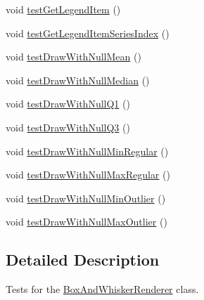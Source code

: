 \begin{DoxyCompactItemize}
\item 
void \mbox{\hyperlink{classorg_1_1jfree_1_1chart_1_1renderer_1_1category_1_1_box_and_whisker_renderer_test_afc41c9e1fb580f8d88d0dc4d55e3d8d6}{test\+Get\+Legend\+Item}} ()
\item 
void \mbox{\hyperlink{classorg_1_1jfree_1_1chart_1_1renderer_1_1category_1_1_box_and_whisker_renderer_test_abb58684c926f0909bea3137fe7d1fa5b}{test\+Get\+Legend\+Item\+Series\+Index}} ()
\item 
void \mbox{\hyperlink{classorg_1_1jfree_1_1chart_1_1renderer_1_1category_1_1_box_and_whisker_renderer_test_afd310ed08773de1125a9bb5cccc7d76e}{test\+Draw\+With\+Null\+Mean}} ()
\item 
void \mbox{\hyperlink{classorg_1_1jfree_1_1chart_1_1renderer_1_1category_1_1_box_and_whisker_renderer_test_a0e1ec38f0f1bec11572fc6311cfcfa0a}{test\+Draw\+With\+Null\+Median}} ()
\item 
void \mbox{\hyperlink{classorg_1_1jfree_1_1chart_1_1renderer_1_1category_1_1_box_and_whisker_renderer_test_a73f9159c849fbd54b7421ed5a1f9985d}{test\+Draw\+With\+Null\+Q1}} ()
\item 
void \mbox{\hyperlink{classorg_1_1jfree_1_1chart_1_1renderer_1_1category_1_1_box_and_whisker_renderer_test_a096520be2c66dad38d5140f5bc9df709}{test\+Draw\+With\+Null\+Q3}} ()
\item 
void \mbox{\hyperlink{classorg_1_1jfree_1_1chart_1_1renderer_1_1category_1_1_box_and_whisker_renderer_test_a0a5ced35511f005e6428a51ef565dcfc}{test\+Draw\+With\+Null\+Min\+Regular}} ()
\item 
void \mbox{\hyperlink{classorg_1_1jfree_1_1chart_1_1renderer_1_1category_1_1_box_and_whisker_renderer_test_a142219f083a423063d924ac8cf5f999a}{test\+Draw\+With\+Null\+Max\+Regular}} ()
\item 
void \mbox{\hyperlink{classorg_1_1jfree_1_1chart_1_1renderer_1_1category_1_1_box_and_whisker_renderer_test_a55d15a00e7c09182c77cdd1787661455}{test\+Draw\+With\+Null\+Min\+Outlier}} ()
\item 
void \mbox{\hyperlink{classorg_1_1jfree_1_1chart_1_1renderer_1_1category_1_1_box_and_whisker_renderer_test_ab565f7a8693148aee3b639da809c603a}{test\+Draw\+With\+Null\+Max\+Outlier}} ()
\end{DoxyCompactItemize}


\subsection{Detailed Description}
Tests for the \mbox{\hyperlink{classorg_1_1jfree_1_1chart_1_1renderer_1_1category_1_1_box_and_whisker_renderer}{Box\+And\+Whisker\+Renderer}} class. 


